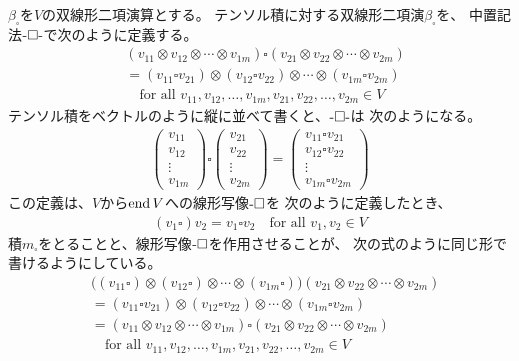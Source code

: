 	$\beta_\square$を$V$の双線形二項演算とする。
	テンソル積に対する双線形二項演$\beta_\square$を、
	中置記法$\myhere\square\myhere$で次のように定義する。
	\begin{equation}\begin{split} %
		&(v_{11}\otimes v_{12}\otimes\cdots\otimes v_{1m})
			\square(v_{21}\otimes v_{22}\otimes\cdots\otimes v_{2m}) \\
		&= (v_{11}\square v_{21})\otimes (v_{12}\square v_{22})\otimes\cdots
			\otimes (v_{1m}\square v_{2m}) \\
		&\quad\text{for all }v_{11},v_{12},\dots,v_{1m},v_{21},v_{22},\dots
			,v_{2m}\in V
	\end{split}\end{equation} %
	テンソル積をベクトルのように縦に並べて書くと、$\myhere\square\myhere$は
	次のようになる。
	\begin{equation*}\begin{split} %
		\begin{pmatrix}
			v_{11}\\ v_{12}\\ \vdots\\ v_{1m}
		\end{pmatrix}\square \begin{pmatrix}
			v_{21}\\ v_{22}\\ \vdots\\ v_{2m}
		\end{pmatrix} = \begin{pmatrix}
			v_{11}\square v_{21}\\ v_{12}\square v_{22}\\
			\vdots\\ v_{1m}\square v_{2m}
		\end{pmatrix}
	\end{split}\end{equation*} %
	この定義は、$V$から$\operatorname{end}V$への線形写像$\myhere\square$を
	次のように定義したとき、
	\begin{equation*}\begin{split} %
		(v_1\square)v_2 = v_1\square v_2 \quad\text{for all } v_1,v_2\in V
	\end{split}\end{equation*} %
	積$m_\square$をとることと、線形写像$\myhere\square$を作用させることが、
	次の式のように同じ形で書けるようにしている。
	\begin{equation}\begin{split} %
		&\bigl((v_{11}\square)\otimes(v_{12}\square)\otimes\cdots
			\otimes(v_{1m}\square)\bigr)
			(v_{21}\otimes v_{22}\otimes\cdots\otimes v_{2m}) \\
		&= (v_{11}\square v_{21})\otimes (v_{12}\square v_{22})\otimes\cdots
			\otimes (v_{1m}\square v_{2m}) \\
		&=(v_{11}\otimes v_{12}\otimes\cdots\otimes v_{1m})
			\square(v_{21}\otimes v_{22}\otimes\cdots\otimes v_{2m}) \\
		&\quad\text{for all }v_{11},v_{12},\dots,v_{1m},v_{21},v_{22},\dots
			,v_{2m}\in V
	\end{split}\end{equation} %

